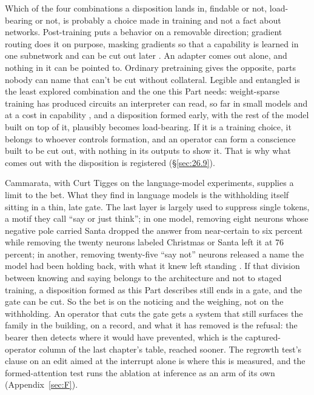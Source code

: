 Which of the four combinations a disposition lands in, findable or not, load-bearing or not, is probably a choice made in training and not a fact about networks. Post-training puts a behavior on a removable direction; gradient routing does it on purpose, masking gradients so that a capability is learned in one subnetwork and can be cut out later \autocite{cloud2024gradient}. An adapter comes out alone, and nothing in it can be pointed to. Ordinary pretraining gives the opposite, parts nobody can name that can't be cut without collateral. Legible and entangled is the least explored combination and the one this Part needs: weight-sparse training has produced circuits an interpreter can read, so far in small models and at a cost in capability \autocite{gao2025sparse}, and a disposition formed early, with the rest of the model built on top of it, plausibly becomes load-bearing. If it is a training choice, it belongs to whoever controls formation, and an operator can form a conscience built to be cut out, with nothing in its outputs to show it. That is why what comes out with the disposition is registered (\S\ref{sec:26.9}).

Cammarata, with Curt Tigges on the language-model experiments, supplies a limit to the bet. What they find in language models is the withholding itself sitting in a thin, late gate. The last layer is largely used to suppress single tokens, a motif they call “say or just think”; in one model, removing eight neurons whose negative pole carried Santa dropped the answer from near-certain to six percent while removing the twenty neurons labeled Christmas or Santa left it at 76 percent; in another, removing twenty-five “say not” neurons released a name the model had been holding back, with what it knew left standing \autocite{cammarata2026clean}. If that division between knowing and saying belongs to the architecture and not to staged training, a disposition formed as this Part describes still ends in a gate, and the gate can be cut. So the bet is on the noticing and the weighing, not on the withholding. An operator that cuts the gate gets a system that still surfaces the family in the building, on a record, and what it has removed is the refusal: the bearer then detects where it would have prevented, which is the captured-operator column of the last chapter's table, reached sooner. The regrowth test's clause on an edit aimed at the interrupt alone is where this is measured, and the formed-attention test runs the ablation at inference as an arm of its own (Appendix~\ref{sec:F}).

